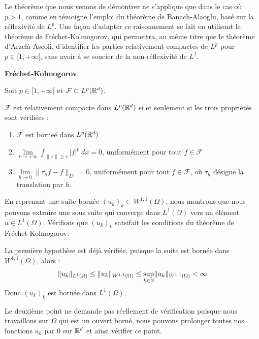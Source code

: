 \begin{remarkbox}
\begin{remark}
    Le théorème que nous venons de démontrer ne s'applique que dans le cas où $p>1$, comme en témoigne l'emploi du théorème de Banach-Alaoglu, basé sur la réflexivité de $L^p$.
    Une façon d'adapter ce raisonnement se fait en utilisant le théorème de Fréchet-Kolmogorov, qui permettra, au même titre que le théorème d'Arzelà-Ascoli, d'identifier les parties relativement compactes de $L^p$ pour $p \in [1,+\infty[$, sans avoir à se soucier de la non-réflexivité de $L^1$.
\end{remark}
\end{remarkbox}

\begin{theorembox}
\begin{theorem}
    \textbf{Fréchet-Kolmogorov}

    Soit $p \in [1,+\infty[$ et $\mathcal{F} \subset L^p(\mathbb{R}^d)$.

    $\mathcal{F}$ est relativement compacte dans $L^p(\mathbb{R}^d)$ si et seulement si les trois propriétés sont vérifiées :
    \begin{enumerate}
        \item $\mathcal{F}$ est borneé dans $L^p(\mathbb{R}^d)$
        \item $ \displaystyle \underset{r \to +\infty}{\lim} \int_{\|x\| \geq r} |f|^p \ dx = 0$, uniformément pour tout $f \in \mathcal{F}$ 
        \item $\displaystyle \underset{h \to 0}{\lim} \| \tau_h f - f \|_{L^p} = 0$, uniformément pour tout $f \in \mathcal{F}$, où $\tau_h$ désigne la translation par $h$.
    \end{enumerate}
\end{theorem}
\end{theorembox}

En reprenant une suite bornée $(u_k)_k \subset W^{1,1}(\Omega)$, nous montrons que nous pouvons extraire une sous suite qui converge dans $L^1(\Omega)$ vers un élément $u \in L^1(\Omega)$.
Vérifions que $(u_k)_k$ satsifait les conditions du théorème de Fréchet-Kolmogorov.

La première hypothèse est déjà vérifiée, puisque la suite est bornée dans $W^{1,1}(\Omega)$, alors :
$$\|u_k\|_{L^1(\Omega)} \leq \|u_k\|_{W^{1,1}(\Omega)} \leq \underset{k\in \mathbb{N}}{\sup}\|u_k\|_{W^{1,1}(\Omega)} < \infty$$
Donc $(u_k)_k$ est bornée dans $L^1(\Omega)$.

Le deuxième point ne demande pas réellement de vérification puisque nous travaillons sur $\Omega$ qui est un ouvert borné, nous pouvons prolonger toutes nos fonctions $u_k$ par 0 sur $\mathbb{R}^d$ et ainsi vérifier ce point.

